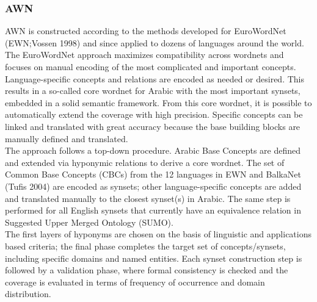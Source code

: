 \subsubsection{AWN}
AWN is constructed according to the methods developed for EuroWordNet (EWN;Vossen 1998) and since applied to dozens of languages around the world. The EuroWordNet approach maximizes compatibility across wordnets and focuses on manual encoding of the most complicated and important concepts\citep{awn_0}. \\
Language-specific concepts and relations are encoded as needed or desired. This results in a so-called core wordnet for Arabic with the most important synsets, embedded in a solid semantic framework. From this core wordnet, it is possible to automatically extend the coverage with high precision. Specific concepts can be linked and translated with great accuracy because the base building blocks are manually defined and translated. \\
The approach follows a top-down procedure. Arabic Base Concepts are defined and extended via hyponymic relations to derive a core wordnet. The set of Common Base Concepts (CBCs) from the 12 languages in EWN and BalkaNet (Tufis 2004) are encoded as synsets; other language-specific concepts are added and translated manually to the closest synset(s) in Arabic. The same step is performed for all English synsets that currently have an equivalence relation in Suggested Upper Merged Ontology (SUMO).\\
The first layers of hyponyms are chosen on the basis of linguistic and applications based criteria; the final phase completes the target set of concepts/synsets, including specific domains and named entities. Each synset construction step is followed by a validation phase, where formal consistency is checked and the coverage is evaluated in terms of frequency of occurrence and domain distribution.\\

